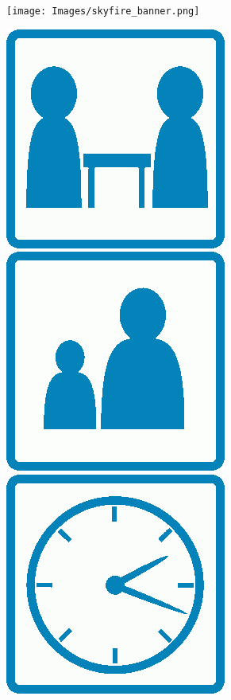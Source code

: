 \documentclass[a5paper, DIV=18, 12pt]{scrartcl}
\begin{document}
\enlargethispage{2\baselineskip}
\vspace{-1ex}
\begin{center}
\texttt{[image: Images/skyfire\_banner.png]}
\end{center}
\vspace{-0.0ex}
\includegraphics[scale=0.125]{Images/Icons/player_count_icon.png} {\setmainfont[Scale=1.25]{Quicksand-Bold}\Huge \raisebox{6.55pt}{\textcolor{SunriseBlue}{:\ 3-5}}} \hfill \includegraphics[scale=0.125]{Images/Icons/player_age_icon.png} {\setmainfont[Scale=1.125]{Quicksand-Bold}\Huge \raisebox{6.55pt}{\textcolor{SunriseBlue}{:\ 12+}}}\hfill \includegraphics[scale=0.125]{Images/Icons/playtime_icon.png} {\setmainfont[Scale=1.125]{Quicksand-Bold}\Huge \raisebox{6.55pt}{\textcolor{SunriseBlue}{:\ 20-30}}}
\end{document}

